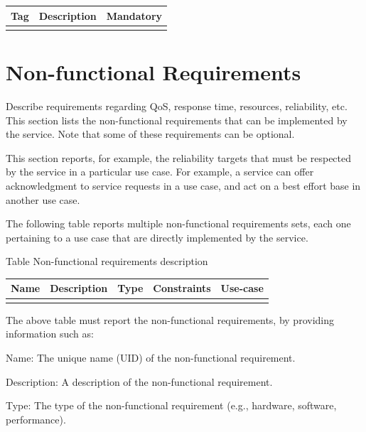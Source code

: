 \documentclass{article}
\newcounter{Table}
\renewcommand\theTable{\arabic{Table}}
\begin{document}
\begin{flushleft}
\tablefirsthead{}
\tablehead{}
\tabletail{}
\tablelasttail{}
\begin{supertabular}{|m{1.0483599in}|m{3.5490599in}|m{1.2573599in}|}
\hline
Tag &
Description &
Mandatory\\\hline
 &
 &
\\\hline
\end{supertabular}
\end{flushleft}
\section[Non{}-functional Requirements]{Non-functional Requirements}
Describe requirements regarding QoS, response time, resources, reliability, etc. This section lists the non-functional requirements that can be implemented by the service. Note that some of these requirements can be optional.

This section reports, for example, the reliability targets that must be respected by the service in a particular use case. For example, a service can offer acknowledgment to service requests in a use case, and act on a best effort base in another use case.

The following table reports multiple non-functional requirements sets, each one pertaining to a use case that are directly implemented by the service.

Table \stepcounter{Table}{\theTable} Non-functional requirements description

\begin{flushleft}
\tablefirsthead{}
\tablehead{}
\tabletail{}
\tablelasttail{}
\begin{supertabular}{|m{0.8997598in}|m{0.9691598in}|m{0.87755984in}|m{1.4955599in}|m{1.3608599in}|}
\hline
Name &
Description &
Type &
Constraints &
Use{}-case\\\hline
 &
 &
 &
 &
\\\hline
\end{supertabular}
\end{flushleft}
The above table must report the non-functional requirements, by providing information such as:

Name: The unique name (UID) of the non-functional requirement.

Description: A description of the non-functional requirement.

Type: The type of the non-functional requirement (e.g., hardware, software, performance).
\end{document}

